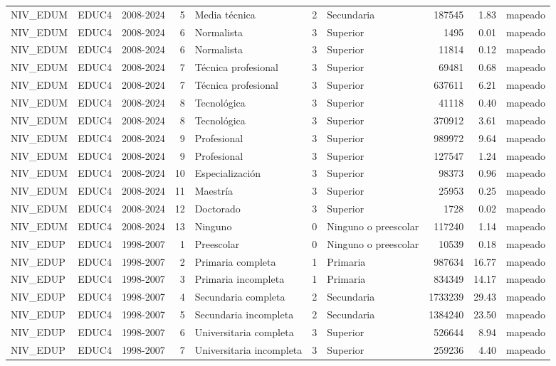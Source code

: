 \begin{tabular}{lllrlllrrl}
NIV\_EDUM & EDUC4 & 2008-2024 & 5 & Media técnica & 2 & Secundaria & 187545 & 1.83 & mapeado \\
NIV\_EDUM & EDUC4 & 2008-2024 & 6 & Normalista & 3 & Superior & 1495 & 0.01 & mapeado \\
NIV\_EDUM & EDUC4 & 2008-2024 & 6 & Normalista & 3 & Superior & 11814 & 0.12 & mapeado \\
NIV\_EDUM & EDUC4 & 2008-2024 & 7 & Técnica profesional & 3 & Superior & 69481 & 0.68 & mapeado \\
NIV\_EDUM & EDUC4 & 2008-2024 & 7 & Técnica profesional & 3 & Superior & 637611 & 6.21 & mapeado \\
NIV\_EDUM & EDUC4 & 2008-2024 & 8 & Tecnológica & 3 & Superior & 41118 & 0.40 & mapeado \\
NIV\_EDUM & EDUC4 & 2008-2024 & 8 & Tecnológica & 3 & Superior & 370912 & 3.61 & mapeado \\
NIV\_EDUM & EDUC4 & 2008-2024 & 9 & Profesional & 3 & Superior & 989972 & 9.64 & mapeado \\
NIV\_EDUM & EDUC4 & 2008-2024 & 9 & Profesional & 3 & Superior & 127547 & 1.24 & mapeado \\
NIV\_EDUM & EDUC4 & 2008-2024 & 10 & Especialización & 3 & Superior & 98373 & 0.96 & mapeado \\
NIV\_EDUM & EDUC4 & 2008-2024 & 11 & Maestría & 3 & Superior & 25953 & 0.25 & mapeado \\
NIV\_EDUM & EDUC4 & 2008-2024 & 12 & Doctorado & 3 & Superior & 1728 & 0.02 & mapeado \\
NIV\_EDUM & EDUC4 & 2008-2024 & 13 & Ninguno & 0 & Ninguno o preescolar & 117240 & 1.14 & mapeado \\
NIV\_EDUP & EDUC4 & 1998-2007 & 1 & Preescolar & 0 & Ninguno o preescolar & 10539 & 0.18 & mapeado \\
NIV\_EDUP & EDUC4 & 1998-2007 & 2 & Primaria completa & 1 & Primaria & 987634 & 16.77 & mapeado \\
NIV\_EDUP & EDUC4 & 1998-2007 & 3 & Primaria incompleta & 1 & Primaria & 834349 & 14.17 & mapeado \\
NIV\_EDUP & EDUC4 & 1998-2007 & 4 & Secundaria completa & 2 & Secundaria & 1733239 & 29.43 & mapeado \\
NIV\_EDUP & EDUC4 & 1998-2007 & 5 & Secundaria incompleta & 2 & Secundaria & 1384240 & 23.50 & mapeado \\
NIV\_EDUP & EDUC4 & 1998-2007 & 6 & Universitaria completa & 3 & Superior & 526644 & 8.94 & mapeado \\
NIV\_EDUP & EDUC4 & 1998-2007 & 7 & Universitaria incompleta & 3 & Superior & 259236 & 4.40 & mapeado \\

\end{tabular}
